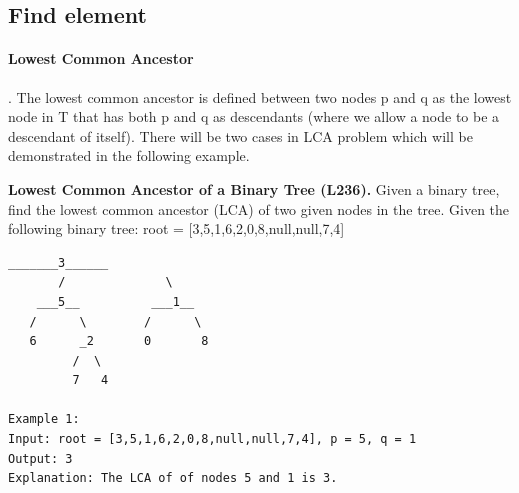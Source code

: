 \documentclass[../main.tex]{subfiles}
\begin{document}
\subsection{Find element}
\paragraph{Lowest Common Ancestor}. The lowest common ancestor is defined between two nodes p and q as the lowest node in T that has both p and q as descendants (where we allow a node to be a descendant of itself). There will be two cases in LCA problem which will be demonstrated in the following example. 
\begin{examples}[resume]
\item \textbf{Lowest Common Ancestor of a Binary Tree (L236).}  Given a binary tree, find the lowest common ancestor (LCA) of two given nodes in the tree. Given the following binary tree:  root = [3,5,1,6,2,0,8,null,null,7,4]
\begin{lstlisting}[numbers=none]
        _______3______
       /              \
    ___5__          ___1__
   /      \        /      \
   6      _2       0       8
         /  \
         7   4

Example 1:
Input: root = [3,5,1,6,2,0,8,null,null,7,4], p = 5, q = 1
Output: 3
Explanation: The LCA of of nodes 5 and 1 is 3.


\end{lstlisting}
\end{examples}
\end{document}
